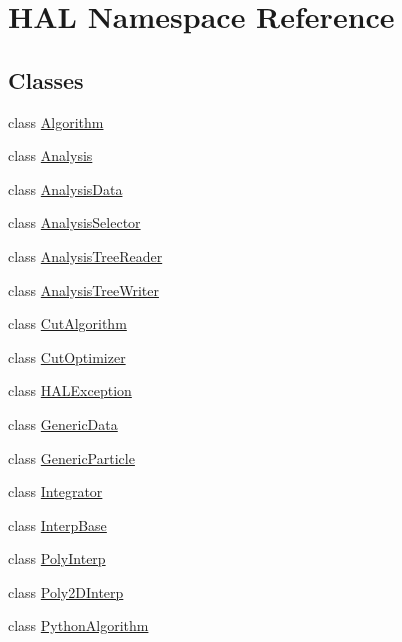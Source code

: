 \hypertarget{namespace_h_a_l}{\section{H\-A\-L Namespace Reference}
\label{namespace_h_a_l}
}
\subsection*{Classes}
\begin{DoxyCompactItemize}
\item 
class \hyperlink{class_h_a_l_1_1_algorithm}{Algorithm}
\item 
class \hyperlink{class_h_a_l_1_1_analysis}{Analysis}
\item 
class \hyperlink{class_h_a_l_1_1_analysis_data}{Analysis\-Data}
\item 
class \hyperlink{class_h_a_l_1_1_analysis_selector}{Analysis\-Selector}
\item 
class \hyperlink{class_h_a_l_1_1_analysis_tree_reader}{Analysis\-Tree\-Reader}
\item 
class \hyperlink{class_h_a_l_1_1_analysis_tree_writer}{Analysis\-Tree\-Writer}
\item 
class \hyperlink{class_h_a_l_1_1_cut_algorithm}{Cut\-Algorithm}
\item 
class \hyperlink{class_h_a_l_1_1_cut_optimizer}{Cut\-Optimizer}
\item 
class \hyperlink{class_h_a_l_1_1_h_a_l_exception}{H\-A\-L\-Exception}
\item 
class \hyperlink{class_h_a_l_1_1_generic_data}{Generic\-Data}
\item 
class \hyperlink{class_h_a_l_1_1_generic_particle}{Generic\-Particle}
\item 
class \hyperlink{class_h_a_l_1_1_integrator}{Integrator}
\item 
class \hyperlink{class_h_a_l_1_1_interp_base}{Interp\-Base}
\item 
class \hyperlink{class_h_a_l_1_1_poly_interp}{Poly\-Interp}
\item 
class \hyperlink{class_h_a_l_1_1_poly2_d_interp}{Poly2\-D\-Interp}
\item 
class \hyperlink{class_h_a_l_1_1_python_algorithm}{Python\-Algorithm}
\end{DoxyCompactItemize}
